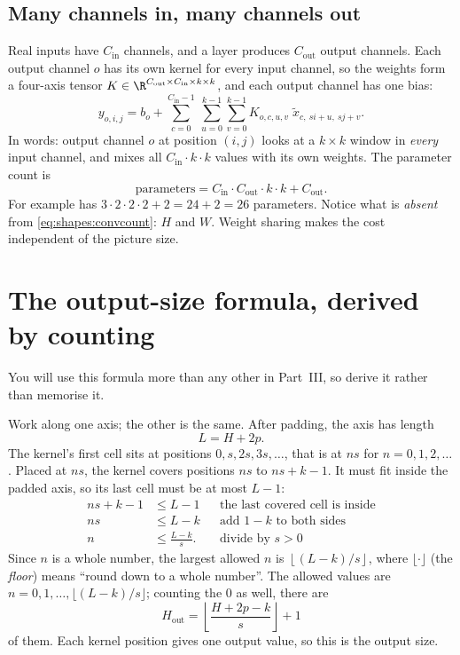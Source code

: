 \subsection{Many channels in, many channels out}

Real inputs have $C_{\text{in}}$ channels, and a layer produces $C_{\text{out}}$ output channels. Each
output channel $o$ has its own kernel for every input channel, so the weights form a four-axis tensor
$K\in\R^{C_{\text{out}}\times C_{\text{in}}\times k\times k}$, and each output channel has one bias:
\begin{equation}\label{eq:shapes:multiconv}
y_{o,i,j} = b_o + \sum_{c=0}^{C_{\text{in}}-1}\ \sum_{u=0}^{k-1}\sum_{v=0}^{k-1}
K_{o,c,u,v}\; \tilde{x}_{c,\ s i+u,\ s j+v}.
\end{equation}
In words: output channel $o$ at position $(i,j)$ looks at a $k\times k$ window in \emph{every} input
channel, and mixes all $C_{\text{in}}\cdot k\cdot k$ values with its own weights. The parameter count is
\begin{equation}\label{eq:shapes:convcount}
\text{parameters} = C_{\text{in}}\cdot C_{\text{out}}\cdot k\cdot k + C_{\text{out}}.
\end{equation}
For example  has $3\cdot2\cdot2\cdot2 + 2 = 24 + 2 = 26$
parameters\tagC. Notice what is \emph{absent} from \cref{eq:shapes:convcount}: $H$ and $W$. Weight
sharing makes the cost independent of the picture size.

\section{The output-size formula, derived by counting}\label{sec:shapes:outsize}

You will use this formula more than any other in Part~III, so derive it rather than memorise it.

Work along one axis; the other is the same. After padding, the axis has length
\[
L = H + 2p .
\]
The kernel's first cell sits at positions $0, s, 2s, 3s, \dots$, that is at $ns$ for $n = 0, 1, 2,
\dots$. Placed at $ns$, the kernel covers positions $ns$ to $ns + k - 1$. It must fit inside the padded
axis, so its last cell must be at most $L-1$:
\begin{align*}
ns + k - 1 &\le L - 1
  && \text{the last covered cell is inside}\\
ns &\le L - k
  && \text{add $1-k$ to both sides}\\
n &\le \frac{L-k}{s}.
  && \text{divide by $s>0$}
\end{align*}
Since $n$ is a whole number, the largest allowed $n$ is $\left\lfloor (L-k)/s \right\rfloor$, where
$\lfloor\cdot\rfloor$ (the \emph{floor}) means ``round down to a whole number''. The
allowed values are $n = 0, 1, \dots, \lfloor (L-k)/s\rfloor$; counting the $0$ as well, there are
\begin{equation}\label{eq:shapes:outsize}
H_{\text{out}} = \left\lfloor \frac{H + 2p - k}{s} \right\rfloor + 1
\end{equation}
of them. Each kernel position gives one output value, so this is the output size.

